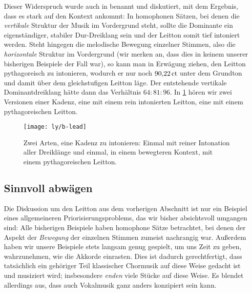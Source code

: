 Dieser Widerspruch wurde auch in \cite[211]{viitasaari} benannt und
diskutiert, mit dem Ergebnis, dass es stark auf den Kontext ankommt: In
homophonen Sätzen, bei denen die \emph{vertikale} Struktur der Musik im
Vordergrund steht, sollte die Dominante ein eigenständiger, stabiler
Dur-Dreiklang sein und der Leitton somit tief intoniert werden. Steht hingegen
die melodische Bewegung einzelner Stimmen, also die \emph{horizontale} Struktur
im Vordergrund (wir merken an, dass dies in keinem unserer bisherigen Beispiele
der Fall war), so kann man in Erwägung ziehen, den Leitton pythagoreisch zu
intonieren, wodurch er nur noch $90{,}22\,\text{ct}$ unter dem Grundton und damit über
dem gleichstufigen Leitton läge. Der entstehende vertikale Dominantdreiklang
hätte dann das Verhältnis $64:81:96$. In \cref{fig:lead} hören wir zwei
Versionen einer Kadenz, eine mit einem rein intonierten Leitton, eine mit einem
pythagoreischen Leitton.

\begin{figure}
  \centering
  \texttt{[image: ly/b-lead]}
  \caption{Zwei Arten, eine Kadenz zu intonieren: Einmal mit reiner
    Intonation aller Dreiklänge und einmal, in einem bewegteren Kontext, mit
    einem pythagoreischen Leitton.}\label{fig:lead}
\end{figure}

\subsection{Sinnvoll abwägen}
\label{sec:balance}

Die Diskussion um den Leitton aus dem vorherigen Abschnitt ist nur ein Beispiel
eines allgemeineren Priorisierungsproblems, das wir bisher absichtsvoll umgangen
sind: Alle bisherigen Beispiele haben homophone Sätze betrachtet, bei denen der
Aspekt der \emph{Bewegung} der einzelnen Stimmen zumeist nachrangig
war. Außerdem haben wir unsere Beispiele stets langsam genug gespielt, um uns
Zeit zu geben, wahrzunehmen, wie die Akkorde einrasten. Dies ist dadurch
gerechtfertigt, dass tatsächlich ein gehöriger Teil klassischer Chormusik auf
diese Weise gedacht ist und musiziert wird; insbesondere \emph{enden} viele
Stücke auf diese Weise. Es blendet allerdings aus, dass auch Vokalmusik ganz
anders konzipiert sein kann.

